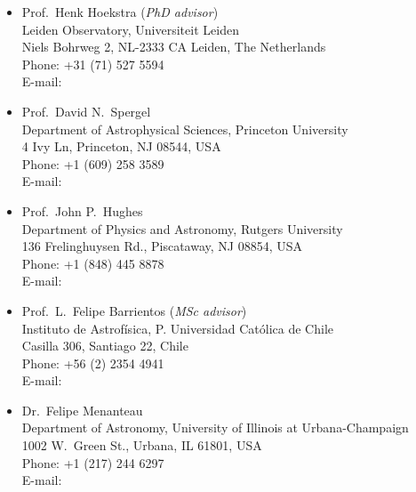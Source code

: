 \documentclass[11pt]{article}
\begin{document}
\begin{itemize}
 \item Prof.~Henk Hoekstra (\textit{PhD advisor})\\
       Leiden Observatory, Universiteit Leiden\\
       Niels Bohrweg 2, NL-2333 CA Leiden, The Netherlands\\
       Phone: +31 (71) 527 5594\\
       E-mail: 
 \item Prof.~David N.~Spergel\\
       Department of Astrophysical Sciences, Princeton University\\
       4 Ivy Ln, Princeton, NJ 08544, USA\\
       Phone: +1 (609) 258 3589\\
       E-mail: 
 \item Prof.~John P.~Hughes\\
       Department of Physics and Astronomy, Rutgers University\\
       136 Frelinghuysen Rd., Piscataway, NJ 08854, USA\\
       Phone: +1 (848) 445 8878\\
       E-mail: 
 \item Prof.~L.~Felipe Barrientos (\textit{MSc advisor})\\
       Instituto de Astrof\'isica, P. Universidad Cat\'olica de Chile\\
       Casilla 306, Santiago 22, Chile\\
       Phone: +56 (2) 2354 4941\\
       E-mail: 
 \item Dr.~Felipe Menanteau\\
       Department of Astronomy, University of Illinois at Urbana-Champaign\\
       1002 W.\ Green St., Urbana, IL 61801, USA\\
       Phone: +1 (217) 244 6297\\
       E-mail: 
\end{itemize}

\vspace{0.3cm}
\hline




 \pagebreak
 
\end{document}
